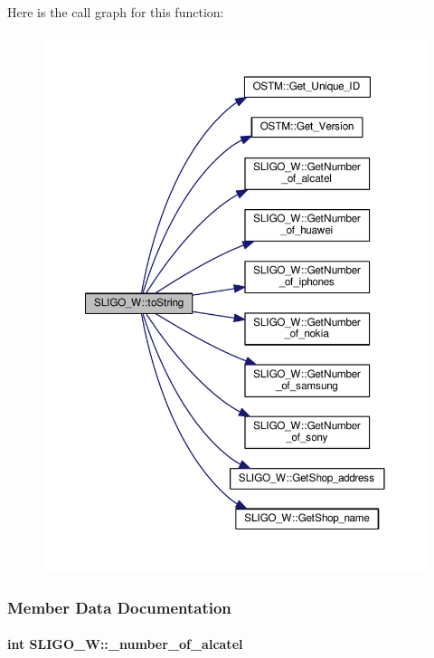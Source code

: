 Here is the call graph for this function\+:\nopagebreak
\begin{figure}[H]
\begin{center}
\leavevmode
\includegraphics[width=350pt]{class_s_l_i_g_o___w_a8f49deaa85f48ff29dd8cdeb7c9dda56_a8f49deaa85f48ff29dd8cdeb7c9dda56_cgraph}
\end{center}
\end{figure}




\subsubsection{Member Data Documentation}
\paragraph[{\texorpdfstring{\+\_\+number\+\_\+of\+\_\+alcatel}{_number_of_alcatel}}]{\setlength{\rightskip}{0pt plus 5cm}int S\+L\+I\+G\+O\+\_\+\+W\+::\+\_\+number\+\_\+of\+\_\+alcatel\hspace{0.3cm}{\ttfamily [private]}}\hypertarget{class_s_l_i_g_o___w_acbf32331901a3fc710c5c97d286b6fcf_acbf32331901a3fc710c5c97d286b6fcf}{}\label{class_s_l_i_g_o___w_acbf32331901a3fc710c5c97d286b6fcf_acbf32331901a3fc710c5c97d286b6fcf}


